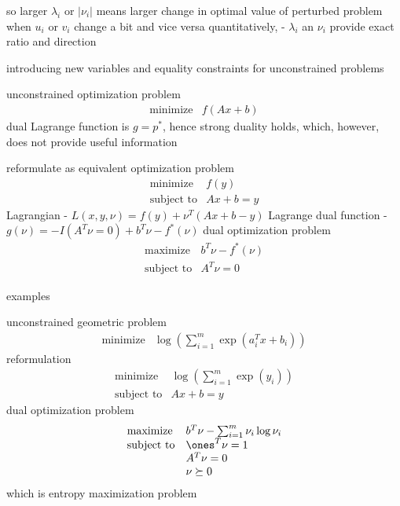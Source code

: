 \documentclass[17pt,landscape]{foils}
\begin{document}
{\vitem
	so larger $\lambda_i$ or $|\nu_i|$ means larger change in optimal value of perturbed problem
	when $u_i$ or $v_i$ change a bit and vice versa
	quantitatively, - $\lambda_i$ an $\nu_i$ provide exact ratio and direction
\eit



\bit
\item
	introducing new variables and equality constraints
	for unconstrained problems
	\bit
	\item
		unconstrained optimization problem\ %
		$$
			\begin{array}{ll}
				\mbox{minimize} &
					f(Ax+b)
			\end{array}
		$$
		\bit
		\iitem
			dual Lagrange function is $g = p^\ast$,
			hence strong duality holds,
			which, however, does not provide useful information
		\eit

	\item
		reformulate as equivalent optimization problem
		$$
			\begin{array}{ll}
				\mbox{minimize} &
					f(y)
				\\
				\mbox{subject to} &
					Ax+b = y
			\end{array}
		$$
		\bit
		\iitem
			Lagrangian
			-
			$
				L(x,y,\nu) = f(y) + \nu^T(Ax+b-y)
			$
		\iitem
			Lagrange dual function
			-
			$
				g(\nu) = -I(A^T\nu = 0) + b^T\nu - f^\ast(\nu)
			$
		\iitem
			dual optimization problem
			$$
				\begin{array}{ll}
					\mbox{maximize} &
						b^T\nu - f^\ast(\nu)
					\\
					\mbox{subject to} &
						A^T \nu = 0
				\end{array}
			$$
		\eit
	\eit
\eit
\vfill

\myfoilhead{}

\bit
\item
	examples
	\bit
	\item
		unconstrained geometric problem
		$$
			\begin{array}{ll}
				\mbox{minimize} &
					\log\left(
						\sum_{i=1}^m \exp(a_i^Tx + b_i)
					\right)
			\end{array}
		$$
		\bit
		\iitem
			reformulation
			$$
				\begin{array}{ll}
					\mbox{minimize} &
						\log\left(
							\sum_{i=1}^m \exp(y_i)
						\right)
					\\
					\mbox{subject to} &
						Ax + b =y
				\end{array}
			$$
		\iitem
			dual optimization problem
			$$
				\begin{array}{ll}
					\mbox{maximize} &
						b^T \nu - \sum_{i=1}^m \nu_i \log \nu_i
					\\
					\mbox{subject to} &
						\ones^T \nu = 1
					\\ &
						A^T \nu = 0
					\\ &
						\nu \succeq 0
				\end{array}
			$$
			which is
			entropy maximization problem
		\eit

}
\end{document}
